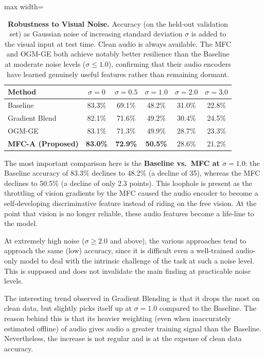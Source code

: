 \documentclass[preprint,a4paper, 10pt, 5p]{elsarticle}
\begin{document}
\begin{table}[h]
\caption{\textbf{Robustness to Visual Noise.} Accuracy (on the held-out validation set) as Gaussian noise of increasing standard deviation $\sigma$ is added to the visual input at test time. Clean audio is always available. The MFC and OGM-GE both achieve notably better resilience than the Baseline at moderate noise levels ($\sigma \leq 1.0$), confirming that their audio encoders have learned genuinely useful features rather than remaining dormant.}
\label{tab:robustness}
\centering
\begin{adjustbox}{max width=\linewidth}\begin{tabular}{@{}lccccc@{}}
\toprule
\textbf{Method} & $\sigma{=}0$ & $\sigma{=}0.5$ & $\sigma{=}1.0$ & $\sigma{=}2.0$ & $\sigma{=}3.0$ \\ \midrule
Baseline             & 83.3\% & 69.1\% & 48.2\% & 31.0\% & 22.8\% \\
Gradient Blend~\cite{wang2020makes} & 82.1\% & 71.6\% & 49.2\% & 30.4\% & 24.5\% \\
OGM-GE~\cite{peng2022balanced}     & 83.1\% & 71.3\% & 49.9\% & 28.7\% & 23.3\% \\
\textbf{MFC-A (Proposed)} & \textbf{83.0\%} & \textbf{72.9\%} & \textbf{50.5\%} & 28.6\% & 21.2\% \\
\bottomrule
\end{tabular}\end{adjustbox}
\end{table}

The most important comparison here is the \textbf{Baseline vs.\ MFC at $\sigma = 1.0$}: the Baseline accuracy of 83.3\% declines to 48.2\% (a decline of 35), whereas the MFC declines to 50.5\% (a decline of only 2.3 points). This loophole is present as the throttling of vision gradients by the MFC caused the audio encoder to become a self-developing discriminative feature instead of riding on the free vision. At the point that vision is no longer reliable, these audio features become a life-line to the model.

At extremely high noise ($\sigma \geq 2.0$ and above), the various approaches tend to approach the same (low) accuracy, since it is difficult even a well-trained audio-only model to deal with the intrinsic challenge of the task at such a noise level. This is supposed and does not invalidate the main finding at practicable noise levels.

The interesting trend observed in Gradient Blending is that it drops the most on clean data, but slightly picks itself up at $\sigma = 1.0$ compared to the Baseline. The reason behind this is that its heavier weighting (even when inaccurately estimated offline) of audio gives audio a greater training signal than the Baseline. Nevertheless, the increase is not regular and is at the expense of clean data accuracy.
\end{document}
